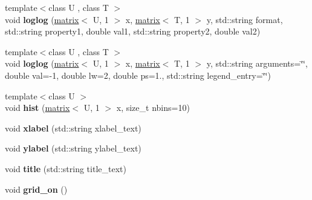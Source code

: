 \begin{DoxyCompactItemize}
\item 
\hypertarget{classkeycpp_1_1_figure_a3cb4cdb5bcc2228492dd7577bc774b34}{{\footnotesize template$<$class U , class T $>$ }\\void {\bfseries loglog} (\hyperlink{classkeycpp_1_1matrix}{matrix}$<$ U, 1 $>$ x, \hyperlink{classkeycpp_1_1matrix}{matrix}$<$ T, 1 $>$ y, std\-::string format, std\-::string property1, double val1, std\-::string property2, double val2)}\label{classkeycpp_1_1_figure_a3cb4cdb5bcc2228492dd7577bc774b34}

\item 
\hypertarget{classkeycpp_1_1_figure_a61dae76a8b73c0bf1af686692c3d57ae}{{\footnotesize template$<$class U , class T $>$ }\\void {\bfseries loglog} (\hyperlink{classkeycpp_1_1matrix}{matrix}$<$ U, 1 $>$ x, \hyperlink{classkeycpp_1_1matrix}{matrix}$<$ T, 1 $>$ y, std\-::string arguments=\char`\"{}\char`\"{}, double val=-\/1, double lw=2, double ps=1., std\-::string legend\-\_\-entry=\char`\"{}\char`\"{})}\label{classkeycpp_1_1_figure_a61dae76a8b73c0bf1af686692c3d57ae}

\item 
\hypertarget{classkeycpp_1_1_figure_acb0fbfcc5f1116fef0a308c9fbde822b}{{\footnotesize template$<$class U $>$ }\\void {\bfseries hist} (\hyperlink{classkeycpp_1_1matrix}{matrix}$<$ U, 1 $>$ x, size\-\_\-t nbins=10)}\label{classkeycpp_1_1_figure_acb0fbfcc5f1116fef0a308c9fbde822b}

\item 
\hypertarget{classkeycpp_1_1_figure_addd610a718f021f3e6c7c94f9bc7f285}{void {\bfseries xlabel} (std\-::string xlabel\-\_\-text)}\label{classkeycpp_1_1_figure_addd610a718f021f3e6c7c94f9bc7f285}

\item 
\hypertarget{classkeycpp_1_1_figure_aa965967db2165b001860f75fc22c9f28}{void {\bfseries ylabel} (std\-::string ylabel\-\_\-text)}\label{classkeycpp_1_1_figure_aa965967db2165b001860f75fc22c9f28}

\item 
\hypertarget{classkeycpp_1_1_figure_a922bd966ed40095f0ae7fa184f9d0ada}{void {\bfseries title} (std\-::string title\-\_\-text)}\label{classkeycpp_1_1_figure_a922bd966ed40095f0ae7fa184f9d0ada}

\item 
\hypertarget{classkeycpp_1_1_figure_a3c036559f8ad56b099ac0b44c652225d}{void {\bfseries grid\-\_\-on} ()}\label{classkeycpp_1_1_figure_a3c036559f8ad56b099ac0b44c652225d}


\end{DoxyCompactItemize}
